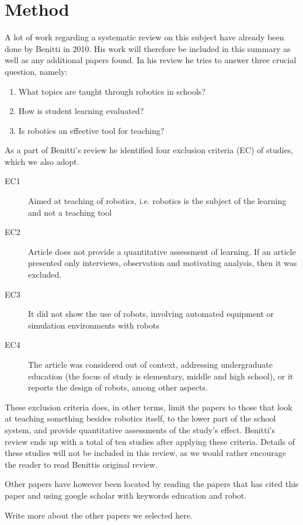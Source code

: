 \section*{Method}
A lot of work regarding a systematic review on this subject have already been done by Benitti\cite{Benitti2012978} in 2010. His work will therefore be included in this summary as well as any additional papers found. In his review he tries to answer three crucial question, namely: 

\begin{enumerate}
  \item What topics are taught through robotics in schools?
  \item How is student learning evaluated?
  \item Is robotics an effective tool for teaching?
\end{enumerate}

\bigskip\noindent
As a part of Benitti's review he identified four exclusion criteria (EC) of studies, which we also adopt.

\begin{description}
  \item[EC1] Aimed at teaching of robotics, i.e. robotics is the subject of the learning and not a teaching tool
  \item[EC2] Article does not provide a quantitative assessment of learning. If an article presented only interviews, observation and motivating
analysis, then it was excluded.
  \item[EC3] It did not show the use of robots, involving automated equipment or simulation environments with robots
	\item[EC4] The article was considered out of context, addressing undergraduate education (the focus of study is elementary, middle and high
school), or it reports the design of robots, among other aspects.
\end{description}

\bigskip\noindent
These exclusion criteria does, in other terms, limit the papers to those that look at teaching something besides robotics itself, to the lower part of the 
school system, and provide quantitative assessments of the study's effect. 
Benitti's review ends up with a total of ten studies after applying these criteria.
Details of these studies will not be included in this review, as we would rather encourage the reader to read Benittis original review. 

\bigskip\noindent
Other papers have however been located by reading the papers that has cited this paper and using google scholar with keywords education and robot. 

\bigskip\noindent
Write more about the other papers we selected here.
